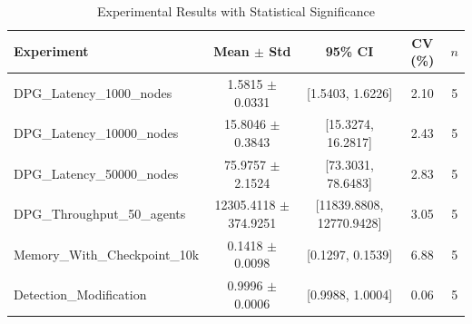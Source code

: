 \begin{table}[t]
\centering
\caption{Experimental Results with Statistical Significance}
\label{tab:results}
\begin{tabular}{lcccc}
\toprule
Experiment & Mean $\pm$ Std & 95\% CI & CV (\%) & $n$ \\
\midrule
DPG_Latency_1000_nodes & 1.5815 $\pm$ 0.0331 & [1.5403, 1.6226] & 2.10 & 5 \\
DPG_Latency_10000_nodes & 15.8046 $\pm$ 0.3843 & [15.3274, 16.2817] & 2.43 & 5 \\
DPG_Latency_50000_nodes & 75.9757 $\pm$ 2.1524 & [73.3031, 78.6483] & 2.83 & 5 \\
DPG_Throughput_50_agents & 12305.4118 $\pm$ 374.9251 & [11839.8808, 12770.9428] & 3.05 & 5 \\
Memory_With_Checkpoint_10k & 0.1418 $\pm$ 0.0098 & [0.1297, 0.1539] & 6.88 & 5 \\
Detection_Modification & 0.9996 $\pm$ 0.0006 & [0.9988, 1.0004] & 0.06 & 5 \\
\bottomrule
\end{tabular}
\end{table}
